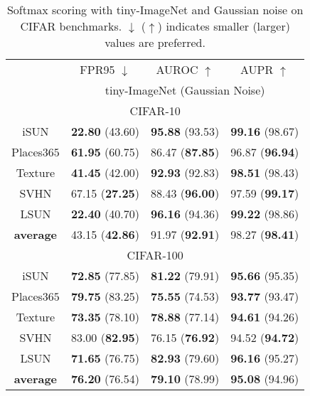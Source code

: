\documentclass{article}
\begin{document}
\begin{table}[t]
\parbox{.47\linewidth}{
\centering
\caption{Softmax scoring with tiny-ImageNet and Gaussian noise on CIFAR benchmarks. $\downarrow$ ($\uparrow$) indicates smaller (larger) values are preferred.} \label{tab: softmax tiny}
\vspace{5pt}
\scriptsize
{
\begin{tabular}{c|ccc}
\toprule[1.5pt]
                   & FPR95 $\downarrow$     & AUROC $\uparrow$       & AUPR $\uparrow$      \\
                   \cline{2-4} 
\multirow{-2}{*}{} & \multicolumn{3}{c}{tiny-ImageNet (Gaussian Noise)} \\
\midrule[0.6pt]
\multicolumn{4}{c}{\cellcolor{greyL}CIFAR-10} \\
\midrule[0.6pt]
iSUN               & \textbf{22.80} (43.60) & \textbf{95.88} (93.53) & \textbf{99.16} (98.67) \\ 
Places$365$        & \textbf{61.95} (60.75) & {86.47} (\textbf{87.85}) & {96.87} (\textbf{96.94}) \\
Texture            & \textbf{41.45} (42.00) & \textbf{92.93} (92.83) & \textbf{98.51} (98.43) \\
SVHN               & {67.15} (\textbf{27.25}) & {88.43} (\textbf{96.00}) & {97.59} (\textbf{99.17}) \\
LSUN             & \textbf{22.40} (40.70) & \textbf{96.16} (94.36) & \textbf{99.22} (98.86) \\
\midrule
\textbf{average}   & {43.15} (\textbf{42.86}) & {91.97} (\textbf{92.91}) & {98.27} (\textbf{98.41}) \\ \midrule[1pt]
\multicolumn{4}{c}{\cellcolor{greyL}CIFAR-100} \\
\midrule[1pt]
iSUN               & \textbf{72.85} (77.85) & \textbf{81.22} (79.91) & \textbf{95.66} (95.35) \\ 
Places$365$        & \textbf{79.75} (83.25) & \textbf{75.55} (74.53) & \textbf{93.77} (93.47) \\
Texture            & \textbf{73.35} (78.10) & \textbf{78.88} (77.14) & \textbf{94.61} (94.26) \\
SVHN               & {83.00} (\textbf{82.95}) & {76.15} (\textbf{76.92}) & {94.52} (\textbf{94.72}) \\
LSUN               & \textbf{71.65} (76.75) & \textbf{82.93} (79.60) & \textbf{96.16} (95.27) \\
\midrule
\textbf{average}   & \textbf{76.20} (76.54) & \textbf{79.10} (78.99) & \textbf{95.08} (94.96) \\ \bottomrule[1.5pt]      

\end{tabular}}}
\end{table}
\end{document}
